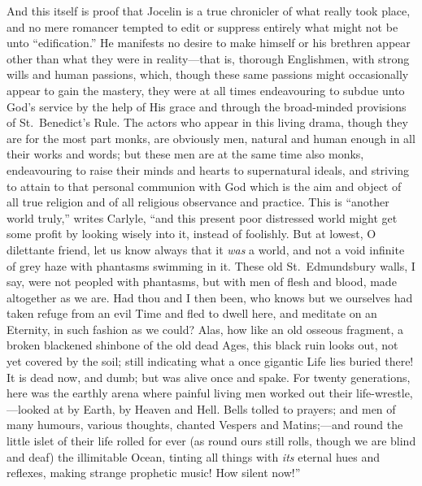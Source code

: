 \documentclass[10pt]{book}
\begin{document}
{{And this itself is proof that Jocelin is a true chronicler of what really took place, and no mere romancer tempted to edit or suppress entirely what might not be unto ``edification.'' He manifests no desire to make himself or his brethren appear other than what they were in reality---that is, thorough Englishmen, with strong wills and human passions, which, though these same passions might occasionally appear to gain the mastery, they were at all times endeavouring to subdue unto God's service by the help of His grace and through the broad-minded provisions of St.\ Benedict's Rule. The actors who appear in this living drama, though they are for the most part monks, are obviously men, natural and human enough in all their works and words; but these men are at the same time also monks, endeavouring to raise their minds and hearts to supernatural ideals, and striving to attain to that personal communion with God which is the aim and object of all true religion and of all religious observance and practice. This is ``another world truly,'' writes Carlyle, ``and this present poor distressed world might get some profit by looking wisely into it, instead of foolishly. But at lowest, O dilettante friend, let us know always that it \emph{was} a world, and not a void infinite of grey haze with phantasms swimming in it. These old St.\ Edmundsbury walls, I say, were not peopled with phantasms, but with men of flesh and blood, made altogether as we are. Had thou and I then been, who knows but we ourselves had taken refuge from an evil Time and fled to dwell here, and meditate on an Eternity, in such fashion as we could? Alas, how like an old osseous fragment, a broken blackened shinbone of the old dead Ages, this black ruin looks out, not yet covered by the soil; still indicating what a once gigantic Life lies buried there! It is dead now, and dumb; but was alive once and spake. For twenty generations, here was the earthly arena where painful living men worked out their life-wrestle,---looked at by Earth, by Heaven and Hell. Bells tolled to prayers; and men of many humours, various thoughts, chanted Vespers and Matins;---and round the little islet of their life rolled for ever (as round ours still rolls, though we are blind and deaf) the illimitable Ocean, tinting all things with \emph{its} eternal hues and reflexes, making strange prophetic music! How silent now!''

}}
\end{document}
